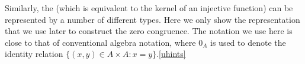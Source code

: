 \begin{code}
\end{code}
\ccpad
Similarly, the  (which is equivalent to the kernel of an injective function) can be represented by a number of different types. Here we only show the representation that we use later to construct the zero congruence. The notation we use here is close to that of conventional algebra notation, where $0_A$ is used to denote the identity relation $\{(x, y) \in A \times A : x = y\}$.\cref{uhints}
\ccpad

